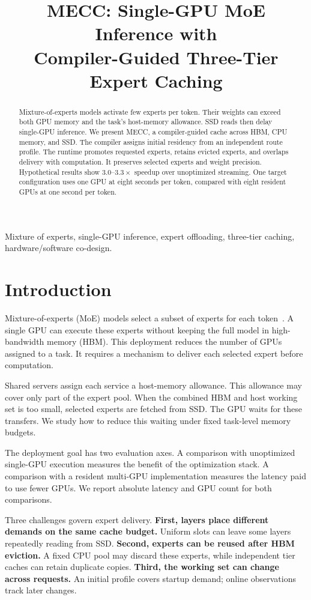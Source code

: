 \documentclass[conference,9pt,letterpaper]{IEEEtran}
\title{MECC: Single-GPU MoE Inference with\protect\\Compiler-Guided Three-Tier Expert Caching}
\author{\IEEEauthorblockN{Anonymous Authors}\IEEEauthorblockA{\mbox{}\\\mbox{}}}
\begin{document}
\maketitle
\begin{abstract}
Mixture-of-experts models activate few experts per token. Their weights can exceed both GPU memory and the task's host-memory allowance. SSD reads then delay single-GPU inference. We present MECC, a compiler-guided cache across HBM, CPU memory, and SSD. The compiler assigns initial residency from an independent route profile. The runtime promotes requested experts, retains evicted experts, and overlaps delivery with computation. It preserves selected experts and weight precision. Hypothetical results show $3.0$--$3.3\times$ speedup over unoptimized streaming. One target configuration uses one GPU at eight seconds per token, compared with eight resident GPUs at one second per token.
\end{abstract}
\begin{IEEEkeywords}
Mixture of experts, single-GPU inference, expert offloading, three-tier caching, hardware/software co-design.
\end{IEEEkeywords}

\section{Introduction}
Mixture-of-experts (MoE) models select a subset of experts for each token~\cite{shazeer,mixtral}. A single GPU can execute these experts without keeping the full model in high-bandwidth memory (HBM). This deployment reduces the number of GPUs assigned to a task. It requires a mechanism to deliver each selected expert before computation.

Shared servers assign each service a host-memory allowance. This allowance may cover only part of the expert pool. When the combined HBM and host working set is too small, selected experts are fetched from SSD. The GPU waits for these transfers. We study how to reduce this waiting under fixed task-level memory budgets.

The deployment goal has two evaluation axes. A comparison with unoptimized single-GPU execution measures the benefit of the optimization stack. A comparison with a resident multi-GPU implementation measures the latency paid to use fewer GPUs. We report absolute latency and GPU count for both comparisons.

Three challenges govern expert delivery. \textbf{First, layers place different demands on the same cache budget.} Uniform slots can leave some layers repeatedly reading from SSD. \textbf{Second, experts can be reused after HBM eviction.} A fixed CPU pool may discard these experts, while independent tier caches can retain duplicate copies. \textbf{Third, the working set can change across requests.} An initial profile covers startup demand; online observations track later changes.
\end{document}
